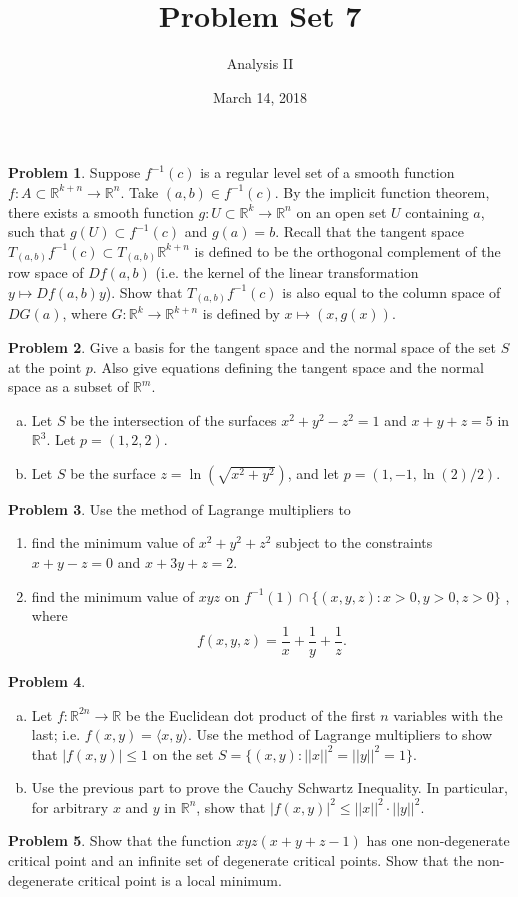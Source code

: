 \documentclass{amsart}
\newcommand{\+}[1]{\ensuremath{\mathbf{#1}}}
\newcommand{\R}{{\mathbb R}}
\theoremstyle{definition}
\newtheorem{prob}{Problem}
\begin{document}
\title{Problem Set 7}
\date{March 14, 2018}
\author{Analysis II}

\maketitle

\begin{prob}
 Suppose $f^{-1}(c)$ is a regular level set of
 a smooth function $f: A \subset \R^{k+n} \to \R^n$.
 Take $(a,b) \in f^{-1}(c)$.  By the implicit function
 theorem, there exists a smooth function $g: U \subset \R^k \to \R^n$
 on an open set $U$ containing $a$,  such that $g(U) \subset f^{-1}(c)$ and $g(a) = b$.
 Recall that the tangent space $T_{(a,b)}f^{-1}(c) \subset T_{(a,b)}\R^{k+n}$
 is defined to be the orthogonal complement of the row space of $Df(a,b)$ (i.e.
 the kernel of the linear transformation $y \mapsto Df(a,b)y$).
 Show that $T_{(a,b)}f^{-1}(c)$ is also equal to the column space of $DG(a)$,
 where $G:\R^k \to \R^{k+n}$
 is defined by $x \mapsto (x,g(x))$.
\end{prob}

\begin{prob}
 Give a basis for the tangent space and the normal space of the set $S$
 at the point $p$.   Also give equations defining the tangent space and the normal space
 as a subset of $\R^{m}$.
 \begin{enumerate}[(a)]
  \item Let $S$ be the intersection of
  the surfaces $x^2 + y^2 - z^2 = 1$ and
  $x +y + z = 5$ in $\R^3$.  Let $p = (1,2,2)$.
  \item Let $S$ be the surface $z = \ln(\sqrt{x^2 + y^2})$,
  and let $p = (1,-1,\ln(2)/2)$.
 \end{enumerate}
\end{prob}

\begin{prob}
Use the method of Lagrange multipliers
to 
\begin{enumerate}
 \item
find
the minimum value of $x^2 + y^2 + z^2$ subject
to the constraints $x+y-z = 0$
and $x+3y+z = 2$.
\item
find the minimum value of $xyz$
on $f^{-1}(1) \cap \{(x,y,z): x>0, y>0, z>0\}$ , where
\[
f(x,y,z) = \frac{1}{x} + \frac{1}{y} + \frac{1}{z}.
\]
\end{enumerate}
\end{prob}

\begin{prob}
\begin{enumerate}[(a)]
 \item
 Let $f: \R^{2n} \to \R$ be the Euclidean
 dot product of the first $n$ variables
 with the last; i.e. $f(x,y) = \langle x, y \rangle$.
 Use the method of Lagrange multipliers
 to show that $|f(x,y)| \leq 1$ on the
 set $S = \{(x,y): ||x||^2 = ||y||^2 = 1\}$. 
\item Use the previous part
to prove the Cauchy Schwartz Inequality.
In particular, for arbitrary $x$ and $y$ in $\R^n$,
show that $|f(x,y)|^2 \leq ||x||^2 \cdot ||y||^2$.
\end{enumerate}
\end{prob}



\begin{prob}
 Show that the function $xyz(x+y+z-1)$
 has one non-degenerate critical point
 and an infinite set of degenerate
 critical points.
 Show that the non-degenerate
 critical point is a local minimum.
\end{prob}
\end{document}
